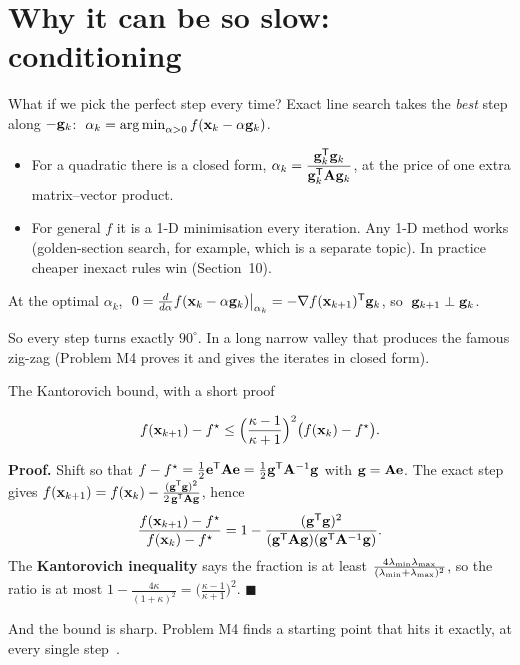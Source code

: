 \section{Why it can be so slow: conditioning}

\begin{frame}{What if we pick the perfect step every time?}
  Exact line search takes the \emph{best} step along $-\mathbf{g}_k$: $\;\alpha_k = \operatorname*{arg\,min}_{\alpha>0}f(\mathbf{x}_k-\alpha\mathbf{g}_k)$.
  \begin{itemize}\small
    \item For a quadratic there is a closed form, $\alpha_k = \dfrac{\mathbf{g}_k^{\mathsf T}\mathbf{g}_k}{\mathbf{g}_k^{\mathsf T}\mathbf{A}\mathbf{g}_k}$, at the price of one extra matrix--vector product.
    \item For general $f$ it is a 1-D minimisation every iteration. Any 1-D method works (golden-section search, for example,
          which is a separate topic). In practice cheaper inexact rules win (Section~10).
  \end{itemize}
  \begin{thmbox}
    At the optimal $\alpha_k$,
    $\;0 = \tfrac{d}{d\alpha}f(\mathbf{x}_k-\alpha\mathbf{g}_k)\big|_{\alpha_k} = -\nabla f(\mathbf{x}_{k+1})^{\mathsf T}\mathbf{g}_k$, so $\;\mathbf{g}_{k+1}\perp\mathbf{g}_k$.
  \end{thmbox}
  \small So every step turns exactly $90^\circ$. In a long narrow valley that produces the famous
  \alert{zig-zag} (Problem M4 proves it and gives the iterates in closed form).
\end{frame}

\begin{frame}{The Kantorovich bound, with a short proof}
  \begin{thmbox}
    \[ f(\mathbf{x}_{k+1})-f^\star \le \Bigl(\frac{\kappa-1}{\kappa+1}\Bigr)^2\bigl(f(\mathbf{x}_k)-f^\star\bigr). \]
  \end{thmbox}
  \small\textbf{Proof.}
  \pause
  Shift so that $f - f^\star = \tfrac12\mathbf{e}^{\mathsf T}\mathbf{A}\mathbf{e} = \tfrac12\mathbf{g}^{\mathsf T}\mathbf{A}^{-1}\mathbf{g}$ with $\mathbf{g} = \mathbf{A}\mathbf{e}$. The exact step gives
  $f(\mathbf{x}_{k+1}) = f(\mathbf{x}_k) - \frac{(\mathbf{g}^{\mathsf T}\mathbf{g})^2}{2\,\mathbf{g}^{\mathsf T}\mathbf{A}\mathbf{g}}$, hence
  \[
    \frac{f(\mathbf{x}_{k+1})-f^\star}{f(\mathbf{x}_k)-f^\star} = 1-\frac{(\mathbf{g}^{\mathsf T}\mathbf{g})^2}{(\mathbf{g}^{\mathsf T}\mathbf{A}\mathbf{g})(\mathbf{g}^{\mathsf T}\mathbf{A}^{-1}\mathbf{g})} .
  \]
  \pause
  The \textbf{Kantorovich inequality} says the fraction is at least $\frac{4\lambda_{\min}\lambda_{\max}}{(\lambda_{\min}+\lambda_{\max})^2}$, so the ratio is at most
  $1-\frac{4\kappa}{(1+\kappa)^2} = \bigl(\frac{\kappa-1}{\kappa+1}\bigr)^2$. $\blacksquare$
  \pause

  \vspace{2pt}
  \footnotesize And the bound is \alert{sharp}. Problem M4 finds a starting point that hits it exactly, at every single step~\cite{nocedal2006,boyd2004}.
\end{frame}

